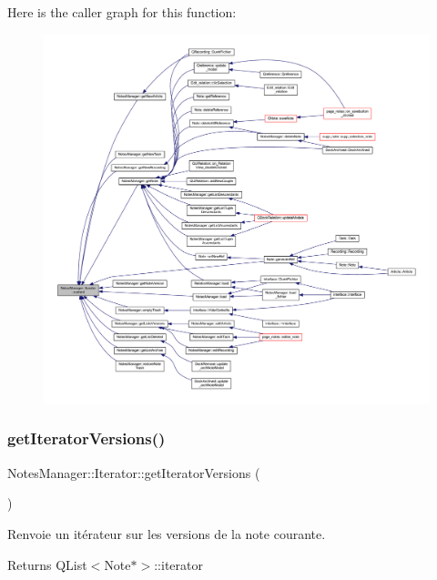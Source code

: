 Here is the caller graph for this function\+:
\nopagebreak
\begin{figure}[H]
\begin{center}
\leavevmode
\includegraphics[width=350pt]{class_notes_manager_1_1_iterator_a4fd73444f2edd5f196d7b950527f5a90_icgraph}
\end{center}
\end{figure}
\mbox{\label{class_notes_manager_1_1_iterator_a09a650ca2eeca614a4129ed5e1795e96}} 
\subsubsection{\texorpdfstring{get\+Iterator\+Versions()}{getIteratorVersions()}}
{\footnotesize\ttfamily Notes\+Manager\+::\+Iterator\+::get\+Iterator\+Versions (\begin{DoxyParamCaption}{ }\end{DoxyParamCaption})\hspace{0.3cm}{\ttfamily [inline]}}



Renvoie un itérateur sur les versions de la note courante. 

\begin{DoxyReturn}{Returns}
Q\+List$<$\+Note$\ast$$>$\+::iterator 
\end{DoxyReturn}


